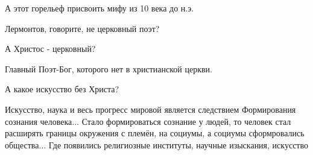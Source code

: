 \begin{itemize}
А этот горельеф присвоить мифу из 10 века до н.э.

Лермонтов, говорите, не церковный поэт?

А Христос - церковный?

Главный Поэт-Бог, которого нет в христианской церкви.

А какое искусство без Христа?


Искусство, наука и весь прогресс мировой является следствием Формирования
сознания человека... Стало формироваться сознание у людей, то человек стал
расширять границы окружения с племён, на социумы, а социумы сформровались
общества... Где появились религиозные институты, научные изыскания, искусство

\end{itemize} %
